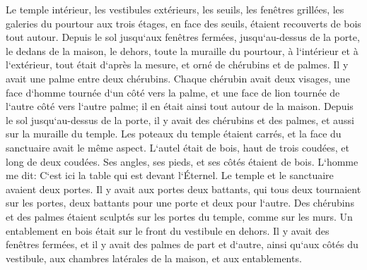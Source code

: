 \verse Le temple intérieur, les vestibules extérieurs, les seuils, les fenêtres grillées, les galeries du pourtour aux trois étages, en face des seuils, étaient recouverts de bois tout autour. Depuis le sol jusqu`aux fenêtres fermées, 
\verse jusqu`au-dessus de la porte, le dedans de la maison, le dehors, toute la muraille du pourtour, à l`intérieur et à l`extérieur, tout était d`après la mesure, 
\verse et orné de chérubins et de palmes. Il y avait une palme entre deux chérubins. Chaque chérubin avait deux visages, 
\verse une face d`homme tournée d`un côté vers la palme, et une face de lion tournée de l`autre côté vers l`autre palme; il en était ainsi tout autour de la maison. 
\verse Depuis le sol jusqu`au-dessus de la porte, il y avait des chérubins et des palmes, et aussi sur la muraille du temple. 
\verse Les poteaux du temple étaient carrés, et la face du sanctuaire avait le même aspect. 
\verse L`autel était de bois, haut de trois coudées, et long de deux coudées. Ses angles, ses pieds, et ses côtés étaient de bois. L`homme me dit: C`est ici la table qui est devant l`Éternel. 
\verse Le temple et le sanctuaire avaient deux portes. 
\verse Il y avait aux portes deux battants, qui tous deux tournaient sur les portes, deux battants pour une porte et deux pour l`autre. 
\verse Des chérubins et des palmes étaient sculptés sur les portes du temple, comme sur les murs. Un entablement en bois était sur le front du vestibule en dehors. 
\verse Il y avait des fenêtres fermées, et il y avait des palmes de part et d`autre, ainsi qu`aux côtés du vestibule, aux chambres latérales de la maison, et aux entablements. 


